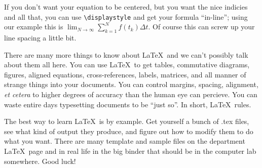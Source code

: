 \documentclass{article}
\begin{document}
If you don't want your equation to be centered, but you want the nice 
indicies and all that, you can use \verb|\displaystyle| and get your 
formula ``in-line''; using our example this is 
$\displaystyle \lim_{N \to \infty} \sum_{k=1}^N f(t_k) \Delta t.$  Of 
course this can screw up your line spacing a little bit.

There are many more things to know about \LaTeX\ and we can't 
possibly talk about them all here.
You can use \LaTeX\ to get tables, commutative diagrams, figures, 
aligned equations, cross-references, labels, matrices, and all manner 
of strange things into your documents.  You can control margins, 
spacing, alignment, {\it et cetera} to higher degrees of accuracy than 
the human eye can percieve.  You can waste entire days typesetting 
documents to be ``just so''.  In short, \LaTeX\ rules.

The best way to learn \LaTeX\ is by example. Get yourself a bunch
of .tex files, see what kind of output they produce, and figure out how
to modify them to do what you want.  There are many template and 
sample files on the department \LaTeX\ page and in real life in the 
big binder that should be in the computer lab somewhere.  Good luck!
\end{document}
